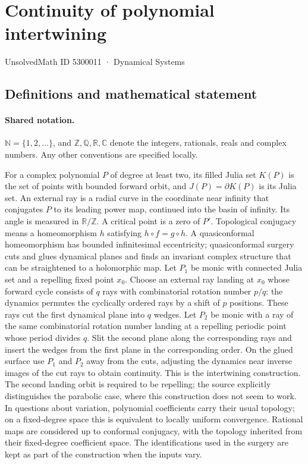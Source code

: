 \documentclass[11pt]{article}
\begin{document}
\setcounter{section}{5300010}
\section{Continuity of polynomial intertwining}\label{5300011}
{\small\sffamily UnsolvedMath ID 5300011 · Dynamical Systems}
\subsection{Definitions and mathematical statement}

\paragraph{Shared notation.}$\mathbb N=\{1,2,\ldots\}$, and $\mathbb Z,\mathbb Q,\mathbb R,\mathbb C$ denote the integers, rationals, reals and complex numbers. Any other conventions are specified locally.


For a complex polynomial $P$ of degree at least two, its filled Julia set $K(P)$ is the set of points with bounded forward orbit, and $J(P)=\partial K(P)$ is its Julia set. An external ray is a radial curve in the coordinate near infinity that conjugates $P$ to its leading power map, continued into the basin of infinity. Its angle is measured in $\mathbb R/\mathbb Z$. A critical point is a zero of $P'$. Topological conjugacy means a homeomorphism $h$ satisfying $h\circ f=g\circ h$. A quasiconformal homeomorphism has bounded infinitesimal eccentricity; quasiconformal surgery cuts and glues dynamical planes and finds an invariant complex structure that can be straightened to a holomorphic map.
Let $P_1$ be monic with connected Julia set and a repelling fixed point $x_0$. Choose an external ray landing at $x_0$ whose forward cycle consists of $q$ rays with combinatorial rotation number $p/q$: the dynamics permutes the cyclically ordered rays by a shift of $p$ positions. These rays cut the first dynamical plane into $q$ wedges. Let $P_2$ be monic with a ray of the same combinatorial rotation number landing at a repelling periodic point whose period divides $q$. Slit the second plane along the corresponding rays and insert the wedges from the first plane in the corresponding order. On the glued surface use $P_1$ and $P_2$ away from the cuts, adjusting the dynamics near inverse images of the cut rays to obtain continuity. This is the intertwining construction. The second landing orbit is required to be repelling; the source explicitly distinguishes the parabolic case, where this construction does not seem to work.
In questions about variation, polynomial coefficients carry their usual topology; on a fixed-degree space this is equivalent to locally uniform convergence. Rational maps are considered up to conformal conjugacy, with the topology inherited from their fixed-degree coefficient space. The identifications used in the surgery are kept as part of the construction when the inputs vary.
\end{document}

